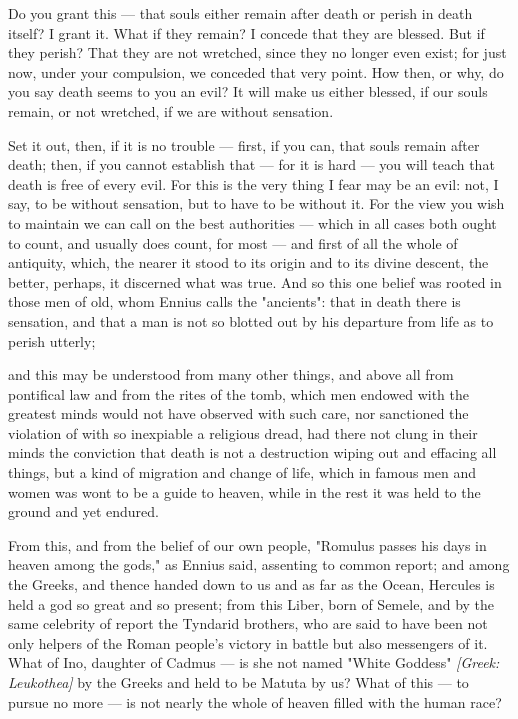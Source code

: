  Do you grant this — that souls either remain after death or perish in death itself? I grant it. What if they remain? I concede that they are blessed. But if they perish? That they are not wretched, since they no longer even exist; for just now, under your compulsion, we conceded that very point. How then, or why, do you say death seems to you an evil? It will make us either blessed, if our souls remain, or not wretched, if we are without sensation.

 Set it out, then, if it is no trouble — first, if you can, that souls remain after death; then, if you cannot establish that — for it is hard — you will teach that death is free of every evil. For this is the very thing I fear may be an evil: not, I say, to be without sensation, but to have to be without it. For the view you wish to maintain we can call on the best authorities — which in all cases both ought to count, and usually does count, for most — and first of all the whole of antiquity, which, the nearer it stood to its origin and to its divine descent, the better, perhaps, it discerned what was true. And so this one belief was rooted in those men of old, whom Ennius calls the "ancients": that in death there is sensation, and that a man is not so blotted out by his departure from life as to perish utterly;

 and this may be understood from many other things, and above all from pontifical law and from the rites of the tomb, which men endowed with the greatest minds would not have observed with such care, nor sanctioned the violation of with so inexpiable a religious dread, had there not clung in their minds the conviction that death is not a destruction wiping out and effacing all things, but a kind of migration and change of life, which in famous men and women was wont to be a guide to heaven, while in the rest it was held to the ground and yet endured.

 From this, and from the belief of our own people, "Romulus passes his days in heaven among the gods," as Ennius said, assenting to common report; and among the Greeks, and thence handed down to us and as far as the Ocean, Hercules is held a god so great and so present; from this Liber, born of Semele, and by the same celebrity of report the Tyndarid brothers, who are said to have been not only helpers of the Roman people's victory in battle but also messengers of it. What of Ino, daughter of Cadmus — is she not named "White Goddess" \textit{[Greek: Leukothea]} by the Greeks and held to be Matuta by us? What of this — to pursue no more — is not nearly the whole of heaven filled with the human race?

